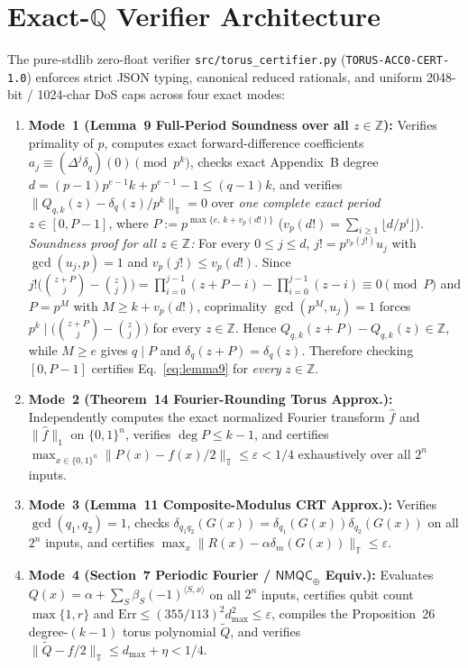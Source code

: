 \documentclass[10pt,twocolumn]{article}
\newcommand{\ZZ}{\mathbb{Z}}
\newcommand{\QQ}{\mathbb{Q}}
\newcommand{\TT}{\mathbb{T}}
\begin{document}
\section{Exact-\texorpdfstring{$\QQ$}{Q} Verifier Architecture}\label{sec:certifier}
The pure-stdlib zero-float verifier \texttt{src/torus\_certifier.py} (\texttt{TORUS-ACC0-CERT-1.0}) enforces strict JSON typing, canonical reduced rationals, and uniform 2048-bit / 1024-char DoS caps across four exact modes:
\begin{enumerate}[leftmargin=1.2em,itemsep=1pt,topsep=2pt]
  \item \textbf{Mode~1 (Lemma~9 Full-Period Soundness over all $z\in\ZZ$):} Verifies primality of $p$, computes exact forward-difference coefficients $a_j \equiv (\Delta^j \delta_q)(0) \pmod{p^k}$, checks exact Appendix~B degree $d = (p-1)p^{e-1}k + p^{e-1}-1 \le (q-1)k$, and verifies $\|Q_{q,k}(z) - \delta_q(z)/p^k\|_\TT = 0$ over \emph{one complete exact period} $z \in [0, P-1]$, where $P := p^{\max\{e,\, k + v_p(d!)\}}$ ($v_p(d!)=\sum_{i\ge 1}\lfloor d/p^i\rfloor$).
  \emph{Soundness proof for all $z\in\ZZ$:} For every $0\le j\le d$, $j! = p^{v_p(j!)} u_j$ with $\gcd(u_j,p)=1$ and $v_p(j!)\le v_p(d!)$. Since $j!\bigl(\binom{z+P}{j}-\binom{z}{j}\bigr) = \prod_{i=0}^{j-1}(z+P-i)-\prod_{i=0}^{j-1}(z-i) \equiv 0 \pmod{P}$ and $P = p^M$ with $M\ge k+v_p(d!)$, coprimality $\gcd(p^M,u_j)=1$ forces $p^k \mid \bigl(\binom{z+P}{j}-\binom{z}{j}\bigr)$ for every $z\in\ZZ$. Hence $Q_{q,k}(z+P)-Q_{q,k}(z)\in\ZZ$, while $M\ge e$ gives $q\mid P$ and $\delta_q(z+P)=\delta_q(z)$. Therefore checking $[0, P-1]$ certifies Eq.~\eqref{eq:lemma9} for \emph{every} $z\in\ZZ$.
  \item \textbf{Mode~2 (Theorem~14 Fourier-Rounding Torus Approx.):} Independently computes the exact normalized Fourier transform $\hat{f}$ and $\|\hat{f}\|_1$ on $\{0,1\}^n$, verifies $\deg P \le k - 1$, and certifies $\max_{x\in\{0,1\}^n} \|P(x) - f(x)/2\|_\TT \le \varepsilon < 1/4$ exhaustively over all $2^n$ inputs.
  \item \textbf{Mode~3 (Lemma~11 Composite-Modulus CRT Approx.):} Verifies $\gcd(q_1, q_2) = 1$, checks $\delta_{q_1 q_2}(G(x)) = \delta_{q_1}(G(x))\delta_{q_2}(G(x))$ on all $2^n$ inputs, and certifies $\max_x \|R(x) - \alpha\delta_m(G(x))\|_\TT \le \varepsilon$.
  \item \textbf{Mode~4 (Section~7 Periodic Fourier / $\mathsf{NMQC}_\oplus$ Equiv.):} Evaluates $Q(x) = \alpha + \sum_S \beta_S (-1)^{\langle S, x\rangle}$ on all $2^n$ inputs, certifies qubit count $\max\{1, r\}$ and $\mathrm{Err} \le (355/113)^2 d_{\max}^2 \le \varepsilon$, compiles the Proposition~26 degree-$(k-1)$ torus polynomial $\tilde{Q}$, and verifies $\|\tilde{Q} - f/2\|_\TT \le d_{\max} + \eta < 1/4$.
\end{enumerate}
\end{document}

